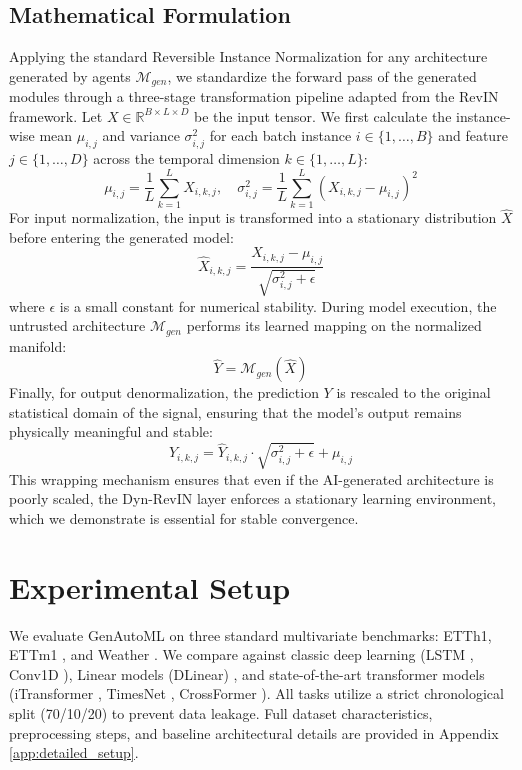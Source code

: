 \documentclass{article}
\begin{document}
\subsection{Mathematical Formulation}

Applying the standard Reversible Instance Normalization \cite{kim2022reversible} for any architecture generated by agents $\mathcal{M}_{gen}$, we standardize the forward pass of the generated modules through a three-stage transformation pipeline adapted from the RevIN framework. Let $X \in \mathbb{R}^{B \times L \times D}$ be the input tensor. We first calculate the instance-wise mean $\mu_{i,j}$ and variance $\sigma_{i,j}^2$ for each batch instance $i \in \{1, \dots, B\}$ and feature $j \in \{1, \dots, D\}$ across the temporal dimension $k \in \{1, \dots, L\}$:
\begin{equation}
\mu_{i,j} = \frac{1}{L} \sum_{k=1}^L X_{i,k,j}, \quad \sigma_{i,j}^2 = \frac{1}{L} \sum_{k=1}^L (X_{i,k,j} - \mu_{i,j})^2
\end{equation}
For input normalization, the input is transformed into a stationary distribution $\hat{X}$ before entering the generated model:
\begin{equation}
\hat{X}_{i,k,j} = \frac{X_{i,k,j} - \mu_{i,j}}{\sqrt{\sigma_{i,j}^2 + \epsilon}}
\end{equation}
where $\epsilon$ is a small constant for numerical stability. During model execution, the untrusted architecture $\mathcal{M}_{gen}$ performs its learned mapping on the normalized manifold:
\begin{equation}
\hat{Y} = \mathcal{M}_{gen}(\hat{X})
\end{equation}
Finally, for output denormalization, the prediction $Y$ is rescaled to the original statistical domain of the signal, ensuring that the model's output remains physically meaningful and stable:
\begin{equation}
Y_{i,k,j} = \hat{Y}_{i,k,j} \cdot \sqrt{\sigma_{i,j}^2 + \epsilon} + \mu_{i,j}
\end{equation}
This wrapping mechanism ensures that even if the AI-generated architecture is poorly scaled, the Dyn-RevIN layer enforces a stationary learning environment, which we demonstrate is essential for stable convergence.

\section{Experimental Setup}

We evaluate GenAutoML on three standard multivariate benchmarks: ETTh1, ETTm1 \cite{zhou2021informer}, and Weather \cite{wu2021autoformer}. We compare against classic deep learning (LSTM \cite{lstm}, Conv1D \cite{bai2018empirical}), Linear models (DLinear) \cite{zeng2022are}, and state-of-the-art transformer models (iTransformer \cite{liu2023itransformer}, TimesNet \cite{wu2022timesnet}, CrossFormer \cite{zhang2023crossformer}). All tasks utilize a strict chronological split (70/10/20) to prevent data leakage. Full dataset characteristics, preprocessing steps, and baseline architectural details are provided in Appendix \ref{app:detailed_setup}.
\end{document}
